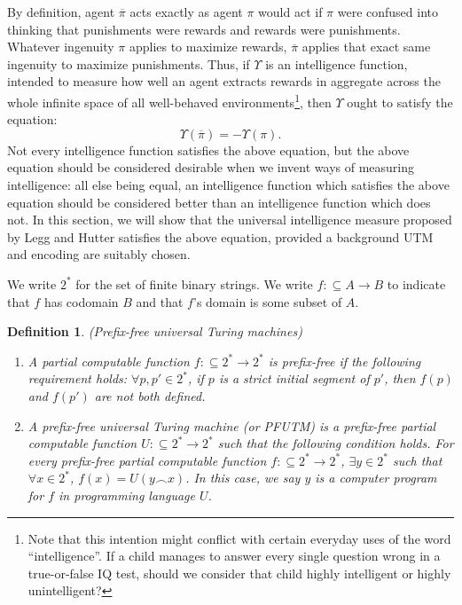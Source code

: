 \documentclass[runningheads]{llncs}
\newtheorem{mydefinition}[mytheorem]{Definition}
\begin{document}
By definition, agent $\overline\pi$ acts exactly as agent $\pi$ would
act if $\pi$ were confused into thinking that punishments were rewards
and rewards were punishments.
Whatever ingenuity $\pi$ applies to maximize rewards,
$\overline\pi$ applies that exact same ingenuity to maximize punishments.
Thus, if $\Upsilon$ is an intelligence function, intended to measure how
well an agent extracts rewards in aggregate across the whole
infinite space of all well-behaved environments\footnote{Note that this intention
might conflict with certain everyday uses of the word ``intelligence''. If a child
manages to answer every single question wrong in a true-or-false IQ test, should we
consider that child highly intelligent or highly unintelligent?}, then $\Upsilon$ ought
to satisfy the equation:
\[
    \Upsilon(\overline\pi) = -\Upsilon(\pi).
\]
Not every intelligence function satisfies the above equation, but the
above equation should be considered desirable when we
invent ways of measuring intelligence: all else being equal, an
intelligence function which satisfies the above equation should be
considered better than an intelligence function which does
not.
In this section, we will show that the universal intelligence measure
proposed by Legg and Hutter satisfies the above equation, provided a
background UTM and encoding are suitably chosen.

We write $2^*$ for the set of finite binary strings.
We write $f:\subseteq A\to B$ to indicate that $f$ has codomain $B$
and that $f$'s domain is some subset of $A$.

\begin{mydefinition}
    (Prefix-free universal Turing machines)
    \begin{enumerate}
        \item A partial computable function $f:\subseteq 2^*\to 2^*$
        is \emph{prefix-free} if the following requirement holds:
        $\forall p,p'\in 2^*$, if $p$ is a strict initial segment of $p'$,
        then $f(p)$ and $f(p')$ are not both defined.
        \item A \emph{prefix-free universal Turing machine}
        (or \emph{PFUTM}) is a prefix-free
        partial computable function $U:\subseteq 2^*\to 2^*$
        such that the following condition holds.
        For every prefix-free partial computable function
        $f:\subseteq 2^*\to 2^*$, $\exists y\in 2^*$ such that
        $\forall x\in 2^*$, $f(x)=U(y\frown x)$.
        In this case, we say $y$ is a \emph{computer program for
        $f$ in programming language $U$}.
    \end{enumerate}
\end{mydefinition}
\end{document}
